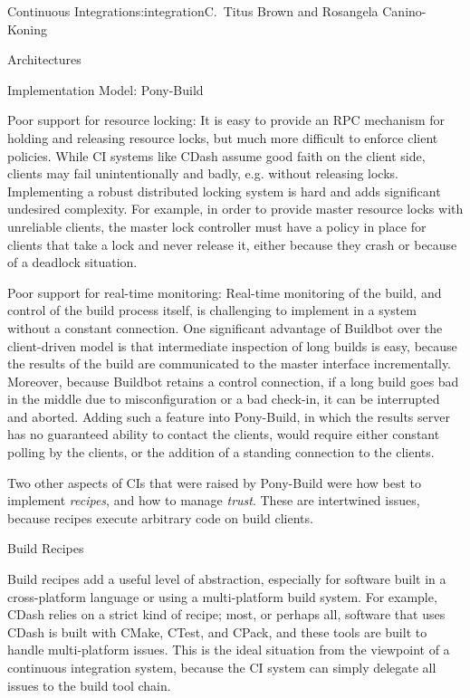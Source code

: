 \begin{aosachapter}{Continuous Integration}{s:integration}{C.\ Titus Brown and Rosangela Canino-Koning}
\begin{aosasect1}{Architectures}
\begin{aosasect2}{Implementation Model: Pony-Build}
\begin{aosadescription}
  \item{Poor support for resource locking:} It is easy to
  provide an RPC mechanism for holding and releasing resource locks,
  but much more difficult to enforce client policies. While CI
  systems like CDash assume good faith on the client side, clients
  may fail unintentionally and badly, e.g. without releasing
  locks. Implementing a robust distributed locking system is hard
  and adds significant undesired complexity. For example, in order
  to provide master resource locks with unreliable clients, the
  master lock controller must have a policy in place for clients
  that take a lock and never release it, either because they crash
  or because of a deadlock situation.

  \item{Poor support for real-time monitoring:} Real-time
  monitoring of the build, and control of the build process
  itself, is challenging to implement in a system without a constant
  connection. One significant advantage of Buildbot over the
  client-driven model is that intermediate inspection of long builds
  is easy, because the results of the build are communicated to the
  master interface incrementally. Moreover, because Buildbot retains
  a control connection, if a long build goes bad in the middle
  due to misconfiguration or a bad check-in, it can be interrupted
  and aborted. Adding such a feature into Pony-Build, in which the
  results server has no guaranteed ability to contact the clients,
  would require either constant polling by the clients, or the
  addition of a standing connection to the clients.

\end{aosadescription}

Two other aspects of CIs that were raised by Pony-Build were how best
to implement \emph{recipes}, and how to manage \emph{trust}. These are
intertwined issues, because recipes execute arbitrary code on build
clients.

\end{aosasect2}

\begin{aosasect2}{Build Recipes}

Build recipes add a useful level of abstraction, especially for
software built in a cross-platform language or using a multi-platform
build system. For example, CDash relies on a strict kind of
recipe; most, or perhaps all, software that uses CDash is built
with CMake, CTest, and CPack, and these tools are built to handle
multi-platform issues. This is the ideal situation from the viewpoint
of a continuous integration system, because the CI system can simply
delegate all issues to the build tool chain.


\end{aosasect2}
\end{aosasect1}
\end{aosachapter}

